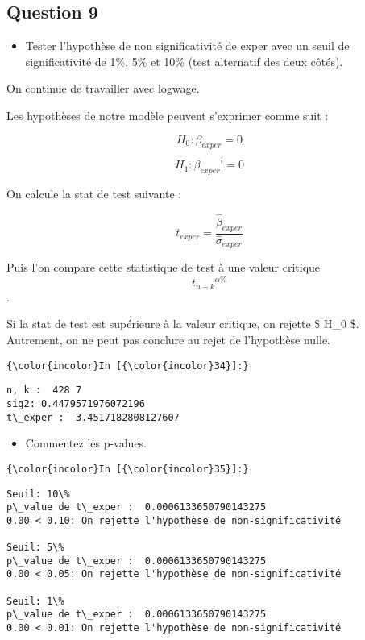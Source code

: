 \documentclass[11pt]{article}
\providecommand{\tightlist}{%
      \setlength{\itemsep}{0pt}\setlength{\parskip}{0pt}}
\begin{document}
    \subsection{Question 9}\label{question-9}

\begin{itemize}
\tightlist
\item
  Tester l'hypothèse de non significativité de exper avec un seuil de
  significativité de 1\%, 5\% et 10\% (test alternatif des deux côtés). 
\end{itemize}

On continue de travailler avec logwage.

    Les hypothèses de notre modèle peuvent s'exprimer comme suit :

\[ H_0 : \beta_{exper} = 0 \]

\[ H_1 : \beta_{exper} != 0 \]

On calcule la stat de test suivante :

\[ t_{exper} = \frac { \hat{\beta}_{exper}} {\hat{\sigma}_{exper}} \]

Puis l'on compare cette statistique de test à une valeur critique
\[ {t_{n-k}}^{\alpha \%} \] .

Si la stat de test est supérieure à la valeur critique, on rejette \$
H\_0 \$. Autrement, on ne peut pas conclure au rejet de l'hypothèse
nulle.

    \begin{Verbatim}[commandchars=\\\{\}]
{\color{incolor}In [{\color{incolor}34}]:} 
\end{Verbatim}


    \begin{Verbatim}[commandchars=\\\{\}]
n, k :  428 7
sig2: 0.4479571976072196
t\_exper :  3.4517182808127607

    \end{Verbatim}

    \begin{itemize}
\tightlist
\item
  Commentez les p-values.
\end{itemize}

    \begin{Verbatim}[commandchars=\\\{\}]
{\color{incolor}In [{\color{incolor}35}]:} 
\end{Verbatim}


    \begin{Verbatim}[commandchars=\\\{\}]
Seuil: 10\%
p\_value de t\_exper :  0.0006133650790143275
0.00 < 0.10: On rejette l'hypothèse de non-significativité 

Seuil: 5\%
p\_value de t\_exper :  0.0006133650790143275
0.00 < 0.05: On rejette l'hypothèse de non-significativité 

Seuil: 1\%
p\_value de t\_exper :  0.0006133650790143275
0.00 < 0.01: On rejette l'hypothèse de non-significativité 


    \end{Verbatim}
\end{document}
